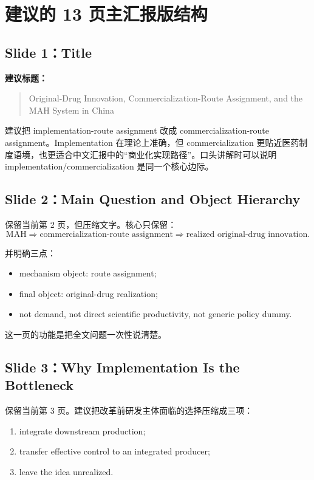 \documentclass[12pt]{ctexart}
\begin{document}
\section{建议的 13 页主汇报版结构}

\subsection{Slide 1：Title}

\textbf{建议标题：}
\begin{quote}
Original-Drug Innovation, Commercialization-Route Assignment, and the MAH System in China
\end{quote}

建议把 implementation-route assignment 改成 commercialization-route assignment。Implementation 在理论上准确，但 commercialization 更贴近医药制度语境，也更适合中文汇报中的“商业化实现路径”。口头讲解时可以说明 implementation/commercialization 是同一个核心边际。

\subsection{Slide 2：Main Question and Object Hierarchy}

保留当前第 2 页，但压缩文字。核心只保留：
\[
\text{MAH}
\Rightarrow
\text{commercialization-route assignment}
\Rightarrow
\text{realized original-drug innovation}.
\]

并明确三点：
\begin{itemize}
    \item mechanism object: route assignment;
    \item final object: original-drug realization;
    \item not demand, not direct scientific productivity, not generic policy dummy.
\end{itemize}

这一页的功能是把全文问题一次性说清楚。

\subsection{Slide 3：Why Implementation Is the Bottleneck}

保留当前第 3 页。建议把改革前研发主体面临的选择压缩成三项：
\begin{enumerate}
    \item integrate downstream production;
    \item transfer effective control to an integrated producer;
    \item leave the idea unrealized.
\end{enumerate}
\end{document}
